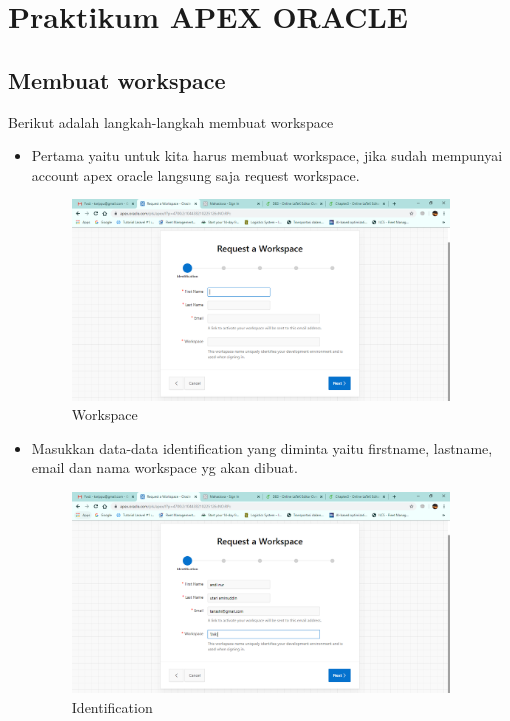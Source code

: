 \chapter{Praktikum APEX ORACLE}
\section{Membuat workspace}
Berikut adalah langkah-langkah membuat workspace
\begin{itemize}
    \item Pertama yaitu untuk kita harus membuat workspace, jika sudah mempunyai account apex oracle langsung saja request workspace.
    \begin{figure}[!htbp]
        \centering
        \includegraphics[width=10cm]{figures/work1.PNG}
        \caption{Workspace}
    \end{figure}
    
    \item Masukkan data-data identification yang diminta yaitu firstname, lastname, email dan nama workspace yg akan dibuat.
    \begin{figure}[!htbp]
        \centering
        \includegraphics[width=10cm]{figures/work2.PNG}
        \caption{Identification}
    \end{figure}
    
    \newpage
    

\end{itemize}
